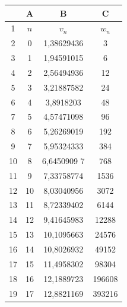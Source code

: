 \begin{minipage}{0.36\linewidth}
{\small\begin{tabular}{c |c|c|c}\hline
	&A &B &C\\ \hline
1 	&$n$&$v_n$& $w_n$\\ \hline
2&0 & 1,38629436 &3\\ \hline
3& 1& 1,94591015 &6\\ \hline
4& 2& 2,56494936 &12\\ \hline
5& 3& 3,21887582 &24\\ \hline
6& 4& 3,8918203 &48\\ \hline
7& 5& 4,57471098 &96\\ \hline
8& 6& 5,26269019 &192\\ \hline
9& 7& 5,95324333 &384\\ \hline
10& 8& 6,6450909 7 &768\\ \hline
11& 9& 7,33758774 &1536\\ \hline
12& 10& 8,03040956 &3072\\ \hline
13& 11& 8,72339402 &6144\\ \hline
14& 12& 9,41645983 &12288\\ \hline
15& 13& 10,1095663 &24576\\ \hline
16& 14& 10,8026932 &49152\\ \hline
17& 15& 11,4958302&98304\\ \hline
18& 16& 12,1889723&196608\\ \hline
19& 17&12,8821169& 393216\\ \hline
\end{tabular}}
\end{minipage}

